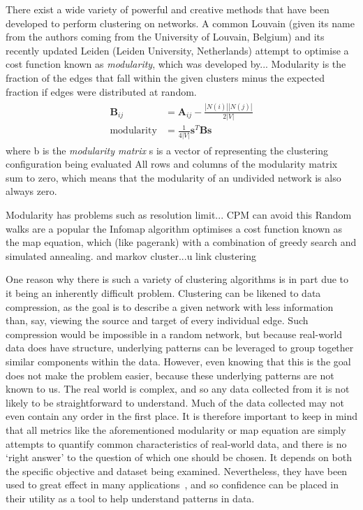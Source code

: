 There exist a wide variety of powerful and creative methods that have been developed to perform clustering on networks. A common 
Louvain (given its name from the authors coming from the University of Louvain, Belgium) and its recently updated Leiden (Leiden University, Netherlands) attempt to optimise a cost function known as \textit{modularity}, which was developed by...
Modularity is the fraction of the edges that fall within the given clusters minus the expected fraction if edges were distributed at random.
\begin{align}
\begin{split}
    \mathbf{B}_{ij} &= \mathbf{A}_{ij} - \frac{|N(i)||N(j)|}{2|V|}\\
    \mathrm{modularity} &= \frac{1}{4|V|}\mathbf{s}^T\mathbf{Bs}
\end{split}
\label{eq:modularity}
\end{align}
where b is the \emph{modularity matrix} s is a vector of representing the clustering configuration being evaluated
All rows and columns of the modularity matrix sum to zero, which means that the modularity of an undivided network is also always zero.

Modularity has problems such as resolution limit... CPM can avoid this
Random walks are a popular the Infomap algorithm optimises a cost function known as the map equation, which (like pagerank) with a combination of greedy search and simulated annealing.
and markov cluster...u
link clustering

One reason why there is such a variety of clustering algorithms is in part due to it being an inherently difficult problem.
Clustering can be likened to data compression, as the goal is to describe a given network with less information than, say, viewing the source and target of every individual edge. Such compression would be impossible in a random network, but because real-world data does have structure, underlying patterns can be leveraged to group together similar components within the data.
However, even knowing that this is the goal does not make the problem easier, because these underlying patterns are not known to us. The real world is complex, and so any data collected from it is not likely to be straightforward to understand. Much of the data collected may not even contain any order in the first place.
It is therefore important to keep in mind that all metrics like the aforementioned modularity or map equation are simply attempts to quantify common characteristics of real-world data, and there is no `right answer' to the question of which one should be chosen. It depends on both the specific objective and dataset being examined. Nevertheless, they have been used to great effect in many applications~\cite{TODO}, and so confidence can be placed in their utility as a tool to help understand patterns in data.

